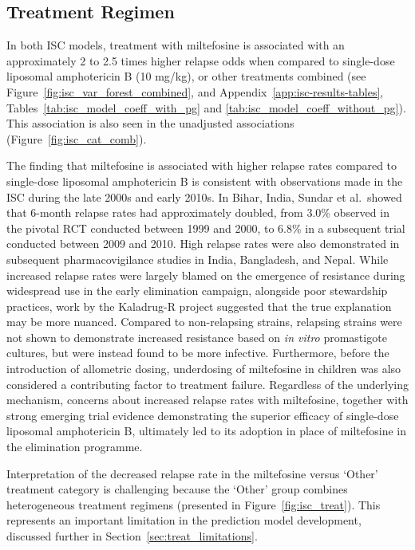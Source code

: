 \subsection{Treatment Regimen}

In both ISC models, treatment with miltefosine is associated with an approximately 2 to 2.5 times higher relapse odds when compared to single-dose liposomal amphotericin B (10 mg/kg), or other treatments combined (see Figure~\ref{fig:isc_var_forest_combined}, and Appendix~\ref{app:isc-results-tables}, Tables~\ref{tab:isc_model_coeff_with_pg} and \ref{tab:isc_model_coeff_without_pg}). This association is also seen in the unadjusted associations (Figure~\ref{fig:isc_cat_comb}).

The finding that miltefosine is associated with higher relapse rates compared to single-dose liposomal amphotericin B is consistent with observations made in the ISC during the late 2000s and early 2010s. In Bihar, India, Sundar et al.\ showed that 6-month relapse rates had approximately doubled, from 3.0\% observed in the pivotal RCT conducted between 1999 and 2000\cite{sundar2002}, to 6.8\% in a subsequent trial conducted between 2009 and 2010\cite{sundar2012}. High relapse rates were also demonstrated in subsequent pharmacovigilance studies in India\cite{pandey2016}, Bangladesh\cite{rahman2011}, and Nepal\cite{rijal2013}. While increased relapse rates were largely blamed on the emergence of resistance during widespread use in the early elimination campaign, alongside poor stewardship practices\cite{sundarEfficacyMiltefosineTreatment2012}, work by the Kaladrug-R project suggested that the true explanation may be more nuanced. Compared to non-relapsing strains, relapsing strains were not shown to demonstrate increased resistance based on \textit{in vitro} promastigote cultures, but were instead found to be more infective\cite{rai2013}. Furthermore, before the introduction of allometric dosing, underdosing of miltefosine in children was also considered a contributing factor to treatment failure\cite{dorlo2017}. Regardless of the underlying mechanism, concerns about increased relapse rates with miltefosine, together with strong emerging trial evidence demonstrating the superior efficacy of single-dose liposomal amphotericin B, ultimately led to its adoption in place of miltefosine in the elimination programme\cite{WHO_KalaAzarElimination_2015}.

Interpretation of the decreased relapse rate in the miltefosine versus `Other' treatment category is challenging because the `Other' group combines heterogeneous treatment regimens (presented in Figure~\ref{fig:isc_treat}). This represents an important limitation in the prediction model development, discussed further in Section~\ref{sec:treat_limitations}.

